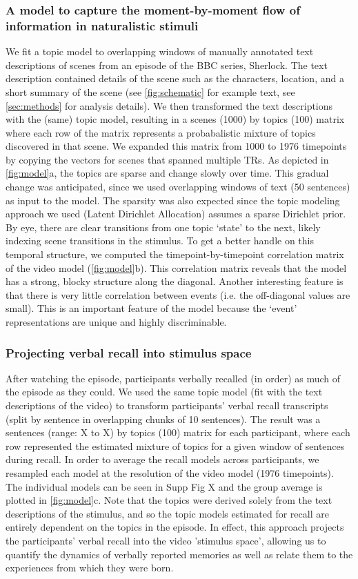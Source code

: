 \documentclass[a4paper,man,natbib,floatsintext]{apa6}
\begin{document}
\subsubsection{A model to capture the moment-by-moment flow of information in naturalistic stimuli}
We fit a topic model to overlapping windows of manually annotated text descriptions of scenes from an episode of the BBC series, Sherlock. The text description contained details of the scene such as the characters, location, and a short summary of the scene (see \ref{fig:schematic} for example text, see \ref{sec:methods} for analysis details). We then transformed the text descriptions with the (same) topic model, resulting in a scenes (1000) by topics (100) matrix where each row of the matrix represents a probabalistic mixture of topics discovered in that scene. We expanded this matrix from 1000 to 1976 timepoints by copying the vectors for scenes that spanned multiple TRs. As depicted in \ref{fig:model}a, the topics are sparse and change slowly over time. This gradual change was anticipated, since we used overlapping windows of text (50 sentences) as input to the model. The sparsity was also expected since the topic modeling approach we used (Latent Dirichlet Allocation) assumes a sparse Dirichlet prior. By eye, there are clear transitions from one topic `state' to the next, likely indexing scene transitions in the stimulus.  To get a better handle on this temporal structure, we computed the timepoint-by-timepoint correlation matrix of the video model (\ref{fig:model}b).  This correlation matrix reveals that the model has a strong, blocky structure along the diagonal.  Another interesting feature is that there is very little correlation between events (i.e. the off-diagonal values are small). This is an important feature of the model because the `event' representations are unique and highly discriminable.

\subsubsection{Projecting verbal recall into stimulus space}
After watching the episode, participants verbally recalled (in order) as much of the episode as they could.  We used the same topic model (fit with the text descriptions of the video) to transform participants' verbal recall transcripts (split by sentence in overlapping chunks of 10 sentences). The result was a sentences (range: X to X) by topics (100) matrix for each participant, where each row represented the estimated mixture of topics for a given window of sentences during recall. In order to average the recall models across participants, we resampled each model at the resolution of the video model (1976 timepoints). The individual models can be seen in Supp Fig X and the group average is plotted in \ref{fig:model}c. Note that the topics were derived solely from the text descriptions of the stimulus, and so the topic models estimated for recall are entirely dependent on the topics in the episode. In effect, this approach projects the participants' verbal recall into the video 'stimulus space', allowing us to quantify the dynamics of verbally reported memories as well as relate them to the experiences from which they were born.
\end{document}
